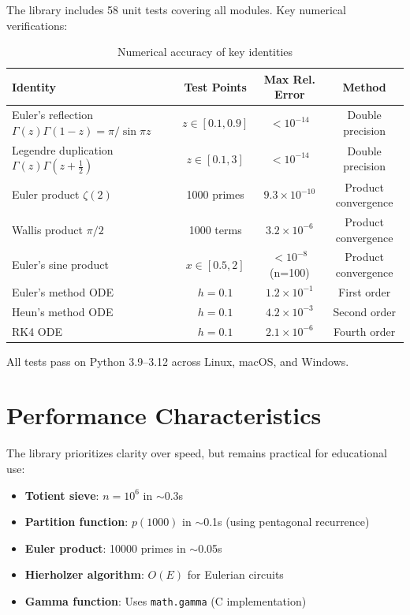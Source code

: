 \documentclass[11pt,a4paper]{article}
\theoremstyle{definition}
\begin{document}
The library includes 58 unit tests covering all modules. Key numerical verifications:

\begin{table}[htbp]
\centering
\caption{Numerical accuracy of key identities}
\label{tab:accuracy}
\begin{tabular}{lccc}
\toprule
\textbf{Identity} & \textbf{Test Points} & \textbf{Max Rel. Error} & \textbf{Method} \\
\midrule
Euler's reflection $\Gamma(z)\Gamma(1-z)=\pi/\sin\pi z$ & $z \in [0.1, 0.9]$ & $< 10^{-14}$ & Double precision \\
Legendre duplication $\Gamma(z)\Gamma(z+\frac12)$ & $z \in [0.1, 3]$ & $< 10^{-14}$ & Double precision \\
Euler product $\zeta(2)$ & 1000 primes & $9.3\times 10^{-10}$ & Product convergence \\
Wallis product $\pi/2$ & 1000 terms & $3.2\times 10^{-6}$ & Product convergence \\
Euler's sine product & $x \in [0.5, 2]$ & $< 10^{-8}$ (n=100) & Product convergence \\
Euler's method ODE & $h=0.1$ & $1.2\times 10^{-1}$ & First order \\
Heun's method ODE & $h=0.1$ & $4.2\times 10^{-3}$ & Second order \\
RK4 ODE & $h=0.1$ & $2.1\times 10^{-6}$ & Fourth order \\
\bottomrule
\end{tabular}
\end{table}

All tests pass on Python 3.9--3.12 across Linux, macOS, and Windows.

\section{Performance Characteristics}
\label{sec:performance}

The library prioritizes clarity over speed, but remains practical for educational use:

\begin{itemize}
    \item \textbf{Totient sieve}: $n=10^6$ in $\sim$0.3s
    \item \textbf{Partition function}: $p(1000)$ in $\sim$0.1s (using pentagonal recurrence)
    \item \textbf{Euler product}: 10000 primes in $\sim$0.05s
    \item \textbf{Hierholzer algorithm}: $O(E)$ for Eulerian circuits
    \item \textbf{Gamma function}: Uses \texttt{math.gamma} (C implementation)
\end{itemize}
\end{document}
